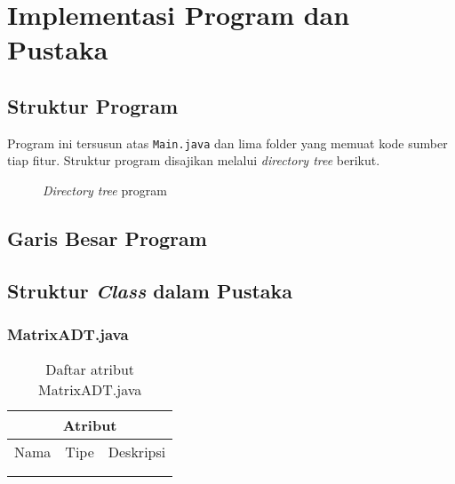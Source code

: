 \section{Implementasi Program dan Pustaka}
\subsection{Struktur Program}
Program ini tersusun atas \verb|Main.java| dan lima folder yang memuat kode sumber tiap fitur. Struktur program disajikan melalui \textit{directory tree} berikut.

\begin{figure}[htb!]
    \centering
    
    \begin{minipage}{7cm}
    \end{minipage}
    \caption{\textit{Directory tree} program}
    \label{fig:dirtree}
\end{figure}

\subsection{Garis Besar Program}

\pagebreak

\subsection{Struktur \textit{Class} dalam Pustaka}
\subsubsection{MatrixADT.java}

\begin{table}[H]
    \centering
    \begin{tabular}{c|c|c}
        \hline
        \hline
        \multicolumn{3}{c}{\textbf{Atribut}}\\
        \hline
        \hline
         Nama & Tipe & Deskripsi \\
         \hline 
         \hline 
         &  & \\
         &  & \\
    \end{tabular}
    \caption{Daftar atribut MatrixADT.java}
\end{table}

